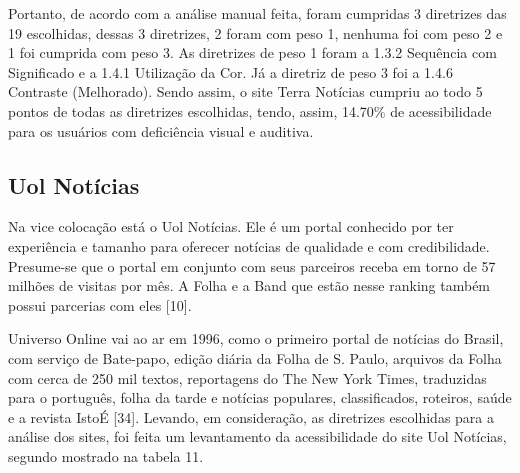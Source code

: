 \documentclass[a4paper]{article}
\begin{document}
\begin{titlepage}
Portanto, de acordo com a análise manual feita, foram cumpridas 3 diretrizes das 19 escolhidas, dessas 3 diretrizes, 2 foram com peso 1, nenhuma foi com peso 2 e 1 foi cumprida com peso 3. As diretrizes de peso 1 foram a 1.3.2 Sequência com Significado e a 1.4.1 Utilização da Cor. Já a diretriz de peso 3 foi a 1.4.6 Contraste (Melhorado). Sendo assim, o site Terra Notícias cumpriu ao todo 5 pontos de todas as diretrizes escolhidas, tendo, assim, 14.70\% de acessibilidade para os usuários com deficiência visual e auditiva.

\subsection{Uol Notícias}

Na vice colocação está o Uol Notícias. Ele é um portal conhecido por ter experiência e tamanho para oferecer notícias de qualidade e com credibilidade. Presume-se que o portal em conjunto com seus parceiros receba em torno de 57 milhões de visitas por mês. A Folha e a Band que estão nesse ranking também possui parcerias com eles [10].

Universo Online vai ao ar em 1996, como o primeiro portal de notícias do Brasil, com serviço de Bate-papo, edição diária da Folha de S. Paulo, arquivos da Folha com cerca de 250 mil textos, reportagens do The New York Times, traduzidas para o português, folha da tarde e notícias populares, classificados, roteiros, saúde e a revista IstoÉ [34]. Levando, em consideração, as diretrizes escolhidas para a análise dos sites, foi feita um levantamento da acessibilidade do site Uol Notícias, segundo mostrado na tabela 11.\\


\end{titlepage}
\end{document}

